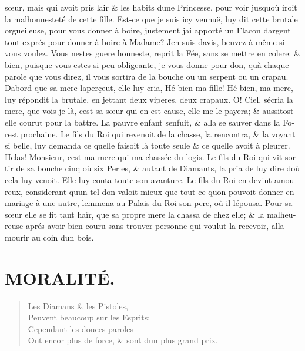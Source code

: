 \documentclass[14pt,a4paper]{memoir}
\newcommand{\notesection}[1]{%
  \addtonotes{\protect\par\protect\vspace{2ex}\protect\noindent\textbf{#1}\protect\par\protect\vspace{1ex}}%
}
\begin{document}
{{\begin{otherlanguage}{french}
sœur, mais qui avoit pris l\textquotesingle air \& les habits
d\textquotesingle une Princesse, pour voir jusqu\textquotesingle où
iroit la malhonnesteté de cette fille. Est-ce que je suis icy vennuë,
luy dit cette brutale orgueileuse, pour vous donner à boire, justement
j\textquotesingle ai apporté un Flacon d\textquotesingle argent tout
exprés pour donner à boire à Madame? J\textquotesingle en suis
d\textquotesingle avis, beuvez à même si vous voulez. Vous
n\textquotesingle estes guere honneste, reprit la Fée, sans se mettre en
colere: \& bien, puisque vous estes si peu obligeante, je vous donne
pour don, qu\textquotesingle à chaque parole que vous direz, il vous
sortira de la bouche ou un serpent ou un crapau. D\textquotesingle abord
que sa mere l\textquotesingle aperçeut, elle luy cria, Hé bien ma fille!
Hé bien, ma mere, luy répondit la brutale, en jettant deux viperes, deux
crapaux. O! Ciel, s\textquotesingle écria la mere, que vois-je-là,
c\textquotesingle est sa sœur qui en est cause, elle me le payera; \&
aussitost elle courut pour la battre. La pauvre enfant
s\textquotesingle enfuit, \& alla se sauver dans la Forest prochaine. Le
fils du Roi qui revenoit de la chasse, la rencontra, \& la voyant si
belle, luy demanda ce qu\textquotesingle elle faisoit là toute seule \&
ce qu\textquotesingle elle avoit à pleurer. Helas! Monsieur,
c\textquotesingle est ma mere qui m\textquotesingle a chassée du logis.
Le fils du Roi qui vit sortir de sa bouche cinq où six Perles, \& autant
de Diamants, la pria de luy dire d\textquotesingle où cela luy venoit.
Elle luy conta toute son avanture. Le fils du Roi en devint amoureux,
considerant qu\textquotesingle un tel don valoit mieux que tout ce
qu\textquotesingle on pouvoit donner en mariage à une autre,
l\textquotesingle emmena au Palais du Roi son pere, où il
l\textquotesingle épousa. Pour sa sœur elle se fit tant haïr, que sa
propre mere la chassa de chez elle; \& la malheureuse aprés avoir bien
couru sans trouver personne qui voulut la recevoir, alla mourir au coin
d\textquotesingle un bois.

\section{MORALITÉ.}
\notesection{MORALITÉ.}

\begin{verse}
  \small
Les Diamans \& les Pistoles, \\
Peuvent beaucoup sur les Esprits; \\
Cependant les douces paroles \\
Ont encor plus de force, \& sont d\textquotesingle un plus grand prix.


\end{verse}
\end{otherlanguage}}}
\end{document}
